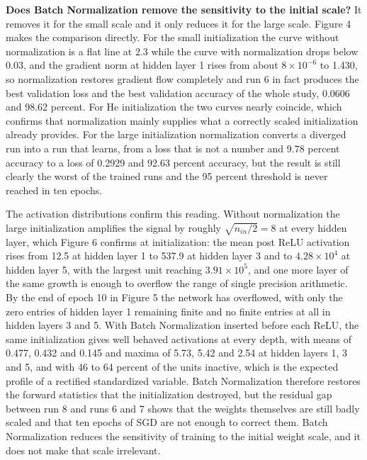 \documentclass[12pt]{article}
\begin{document}
\textbf{Does Batch Normalization remove the sensitivity to the initial scale?} It removes it for the small scale and it only reduces it for the large scale. Figure 4 makes the comparison directly. For the small initialization the curve without normalization is a flat line at 2.3 while the curve with normalization drops below 0.03, and the gradient norm at hidden layer 1 rises from about $8 \times 10^{-6}$ to 1.430, so normalization restores gradient flow completely and run 6 in fact produces the best validation loss and the best validation accuracy of the whole study, 0.0606 and 98.62 percent. For He initialization the two curves nearly coincide, which confirms that normalization mainly supplies what a correctly scaled initialization already provides. For the large initialization normalization converts a diverged run into a run that learns, from a loss that is not a number and 9.78 percent accuracy to a loss of 0.2929 and 92.63 percent accuracy, but the result is still clearly the worst of the trained runs and the 95 percent threshold is never reached in ten epochs.

The activation distributions confirm this reading. Without normalization the large initialization amplifies the signal by roughly $\sqrt{n_{in}/2} = 8$ at every hidden layer, which Figure 6 confirms at initialization: the mean post ReLU activation rises from 12.5 at hidden layer 1 to 537.9 at hidden layer 3 and to $4.28 \times 10^{4}$ at hidden layer 5, with the largest unit reaching $3.91 \times 10^{5}$, and one more layer of the same growth is enough to overflow the range of single precision arithmetic. By the end of epoch 10 in Figure 5 the network has overflowed, with only the zero entries of hidden layer 1 remaining finite and no finite entries at all in hidden layers 3 and 5. With Batch Normalization inserted before each ReLU, the same initialization gives well behaved activations at every depth, with means of 0.477, 0.432 and 0.145 and maxima of 5.73, 5.42 and 2.54 at hidden layers 1, 3 and 5, and with 46 to 64 percent of the units inactive, which is the expected profile of a rectified standardized variable. Batch Normalization therefore restores the forward statistics that the initialization destroyed, but the residual gap between run 8 and runs 6 and 7 shows that the weights themselves are still badly scaled and that ten epochs of SGD are not enough to correct them. Batch Normalization reduces the sensitivity of training to the initial weight scale, and it does not make that scale irrelevant.
\end{document}
